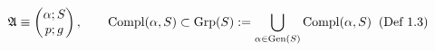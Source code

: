 \documentclass[preview]{standalone}
\begin{document}
\begin{align*}
\special{dvisvgm:raw <g id='unique000'>}\mathfrak{A} \equiv \begin{pmatrix} \alpha ; S \\ p ; g \end{pmatrix}, \qquad \operatorname{Compl}(\alpha, S) \subset \operatorname{Grp}(S) := \bigcup_{\alpha\in\operatorname{Gen}(S)} \operatorname{Compl}(\alpha, S)\;\; (\text{Def 1.3})\special{dvisvgm:raw </g>}
\end{align*}
\end{document}
